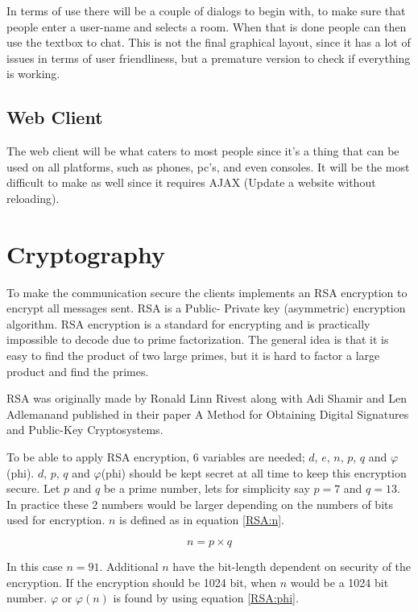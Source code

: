 In terms of use there will be a couple of dialogs to begin with, to make sure that people enter a user-name and selects a room. When that is done people can then use the textbox to chat. This is not the final graphical layout, since it has a lot of issues in terms of user friendliness, but a premature version to check if everything is working.


\subsection{Web Client}

The web client will be what caters to most people since it's a thing that can be used on all platforms, such as phones, pc's, and even consoles. It will be the most difficult to make as well since it requires AJAX (Update a website without reloading).

\section{Cryptography}

To make the communication secure the clients implements an RSA encryption to encrypt all messages sent. RSA is a Public- Private key (asymmetric) encryption algorithm. RSA encryption is a standard for encrypting and is practically impossible to decode due to prime factorization. The general idea is that it is easy to find the product of two large primes, but it is hard to factor a large product and find the primes.

RSA was originally made by Ronald Linn Rivest along with Adi Shamir and Len Adlemanand published in their paper A Method for Obtaining Digital Signatures and Public-Key Cryptosystems\cite{RSA}.

To be able to apply RSA encryption, 6 variables are needed; $d$, $e$, $n$, $p$, $q$ and $\varphi$(phi). $d$, $p$, $q$ and $\varphi$(phi) should be kept secret at all time to keep this encryption secure. Let $p$ and $q$ be a prime number, lets for simplicity say $p=7$ and $q=13$. In practice these 2 numbers would be larger depending on the numbers of bits used for encryption. $n$ is defined as in equation \ref{RSA:n}.

\begin{equation}
n = p \times q
\label{RSA:n}
\end{equation}

In this case $n=91$. Additional $n$ have the bit-length dependent on security of the encryption. If the encryption should be 1024 bit, when $n$ would be a 1024 bit number. $\varphi$ or $\varphi(n)$ is found by using equation \ref{RSA:phi}.

